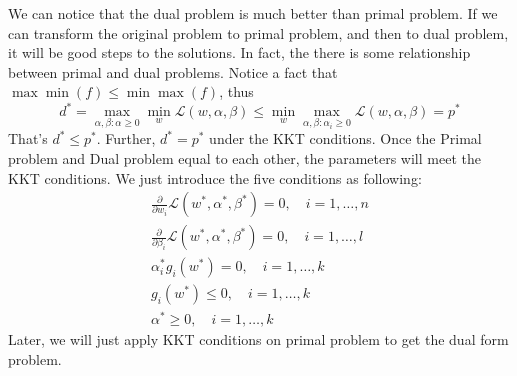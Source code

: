 \documentclass[a4paper]{article}
\begin{document}
We can notice that the dual problem is much better than primal problem. If we can transform the original problem to primal problem, and then to dual problem, it will be good steps to the solutions. In fact, the there is some relationship between primal and dual problems. Notice a fact that $\max \min (f) \leq \min \max (f)$, thus
$$
d^\ast = \max_{\alpha, \beta : \alpha \geq 0} \min_{w} \mathcal{L} (w, \alpha, \beta) \leq \min_{w}  \max_{\alpha, \beta : \alpha_i \geq 0} \mathcal{L}(w, \alpha, \beta) = p^\ast
$$
That's $d^\ast \leq p^\ast$. Further, $d^\ast = p^\ast$ under the KKT conditions.
Once the Primal problem and Dual problem equal to each other, the parameters will meet the KKT conditions. We just introduce the five conditions as following:
\begin{align}
	\frac{\partial}{\partial w_i} \mathcal{L}(w^\ast, \alpha ^ \ast, \beta^\ast) = 0, \quad i = 1, \dots, n \\
	\frac{\partial}{\partial \beta_i} \mathcal{L}(w^\ast, \alpha ^ \ast, \beta^\ast) = 0, \quad i = 1, \dots, l \\
	\alpha_{i}^\ast g_i(w^\ast) = 0, \quad i = 1, \dots, k \\
	g_i(w^\ast) \leq 0, \quad i = 1, \dots, k \\
	\alpha^\ast \geq 0, \quad i = 1, \dots, k 
\end{align}
Later, we will just apply KKT conditions on primal problem to get the dual form problem. 
\end{document}
